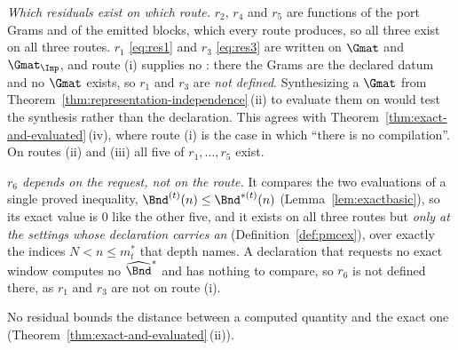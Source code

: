 \begin{definition}
\emph{Which residuals exist on which route.} $r_2$, $r_4$ and $r_5$ are
functions of the port Grams and of the emitted blocks, which every route
produces, so all three exist on all three routes. $r_1$ \eqref{eq:res1} and
$r_3$ \eqref{eq:res3} are written on $\Gmat$ and $\Gmat_{\Inp}$, and route (i)
supplies no : there the Grams are the declared datum and no
$\Gmat$ exists, so $r_1$ and $r_3$ are \emph{not defined}. Synthesizing a
$\Gmat$ from Theorem~\ref{thm:representation-independence}\,(ii) to evaluate them on would test the
synthesis rather than the declaration. This agrees with
Theorem~\ref{thm:exact-and-evaluated}\,(iv), where route (i) is the case in which ``there is
no compilation''. On routes (ii) and (iii) all five of $r_1,\dots,r_5$ exist.

\emph{$r_6$ depends on the request, not on the route.} It compares the two
evaluations of a single proved inequality, $\Bnd^{(t)}(n)\le
\Bnd^{\ast(t)}(n)$ (Lemma~\ref{lem:exactbasic}), so its exact value is $0$
like the other five, and it exists on all three routes but \emph{only at the
settings whose declaration carries an }
(Definition~\ref{def:pmcex}), over exactly the indices $N<n\le m^{\ast}_t$ that
depth names. A declaration that requests no exact window computes no
$\widehat\Bnd^{\ast}$ and has nothing to compare, so $r_6$ is not defined
there, as $r_1$ and $r_3$ are not on route (i).

No residual bounds the distance between a computed quantity and the exact
one (Theorem~\ref{thm:exact-and-evaluated}\,(ii)).
\end{definition}
